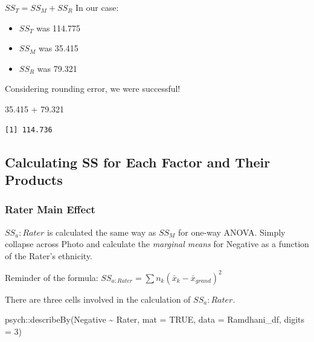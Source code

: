 \documentclass[
  11pt,
]{book}
\newenvironment{Shaded}{\begin{snugshade}}{\end{snugshade}}
\newcommand{\AttributeTok}[1]{\textcolor[rgb]{0.77,0.63,0.00}{#1}}
\newcommand{\ConstantTok}[1]{\textcolor[rgb]{0.00,0.00,0.00}{#1}}
\newcommand{\DecValTok}[1]{\textcolor[rgb]{0.00,0.00,0.81}{#1}}
\newcommand{\FloatTok}[1]{\textcolor[rgb]{0.00,0.00,0.81}{#1}}
\newcommand{\FunctionTok}[1]{\textcolor[rgb]{0.00,0.00,0.00}{#1}}
\newcommand{\NormalTok}[1]{#1}
\newcommand{\SpecialCharTok}[1]{\textcolor[rgb]{0.00,0.00,0.00}{#1}}
\providecommand{\tightlist}{%
  \setlength{\itemsep}{0pt}\setlength{\parskip}{0pt}}
\begin{document}
\(SS_T = SS_M + SS_R\)
In our case:

\begin{itemize}
\tightlist
\item
  \(SS_T\) was 114.775
\item
  \(SS_M\) was 35.415
\item
  \(SS_R\) was 79.321
\end{itemize}

Considering rounding error, we were successful!

\begin{Shaded}
\begin{Highlighting}[]
\FloatTok{35.415} \SpecialCharTok{+} \FloatTok{79.321}
\end{Highlighting}
\end{Shaded}

\begin{verbatim}
[1] 114.736
\end{verbatim}

\hypertarget{calculating-ss-for-each-factor-and-their-products}{%
\subsection{Calculating SS for Each Factor and Their Products}\label{calculating-ss-for-each-factor-and-their-products}}

\hypertarget{rater-main-effect}{%
\subsubsection{Rater Main Effect}\label{rater-main-effect}}

\(SS_a:Rater\) is calculated the same way as \(SS_M\) for one-way ANOVA. Simply collapse across Photo and calculate the \emph{marginal means} for Negative as a function of the Rater's ethnicity.

Reminder of the formula: \(SS_{a:Rater}= \sum n_{k}(\bar{x}_{k}-\bar{x}_{grand})^{2}\)

There are three cells involved in the calculation of \(SS_a:Rater\).

\begin{Shaded}
\begin{Highlighting}[]
\NormalTok{psych}\SpecialCharTok{::}\FunctionTok{describeBy}\NormalTok{(Negative }\SpecialCharTok{\textasciitilde{}}\NormalTok{ Rater, }\AttributeTok{mat =} \ConstantTok{TRUE}\NormalTok{, }\AttributeTok{data =}\NormalTok{ Ramdhani\_df, }\AttributeTok{digits =} \DecValTok{3}\NormalTok{)}
\end{Highlighting}
\end{Shaded}
\end{document}
